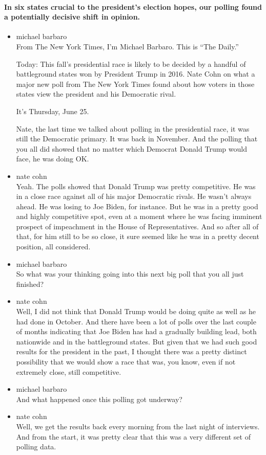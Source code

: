 \hypertarget{in-six-states-crucial-to-the-presidents-election-hopes-our-polling-found-a-potentially-decisive-shift-in-opinion}{%
\paragraph{In six states crucial to the president's election hopes, our
polling found a potentially decisive shift in
opinion.}\label{in-six-states-crucial-to-the-presidents-election-hopes-our-polling-found-a-potentially-decisive-shift-in-opinion}}

\begin{itemize}
\item
  michael barbaro\\
  From The New York Times, I'm Michael Barbaro. This is ``The Daily.''

  Today: This fall's presidential race is likely to be decided by a
  handful of battleground states won by President Trump in 2016. Nate
  Cohn on what a major new poll from The New York Times found about how
  voters in those states view the president and his Democratic rival.

  It's Thursday, June 25.

  Nate, the last time we talked about polling in the presidential race,
  it was still the Democratic primary. It was back in November. And the
  polling that you all did showed that no matter which Democrat Donald
  Trump would face, he was doing OK.
\item
  nate cohn\\
  Yeah. The polls showed that Donald Trump was pretty competitive. He
  was in a close race against all of his major Democratic rivals. He
  wasn't always ahead. He was losing to Joe Biden, for instance. But he
  was in a pretty good and highly competitive spot, even at a moment
  where he was facing imminent prospect of impeachment in the House of
  Representatives. And so after all of that, for him still to be so
  close, it sure seemed like he was in a pretty decent position, all
  considered.
\item
  michael barbaro\\
  So what was your thinking going into this next big poll that you all
  just finished?
\item
  nate cohn\\
  Well, I did not think that Donald Trump would be doing quite as well
  as he had done in October. And there have been a lot of polls over the
  last couple of months indicating that Joe Biden has had a gradually
  building lead, both nationwide and in the battleground states. But
  given that we had such good results for the president in the past, I
  thought there was a pretty distinct possibility that we would show a
  race that was, you know, even if not extremely close, still
  competitive.
\item
  michael barbaro\\
  And what happened once this polling got underway?
\item
  nate cohn\\
  Well, we get the results back every morning from the last night of
  interviews. And from the start, it was pretty clear that this was a
  very different set of polling data.


\end{itemize}
